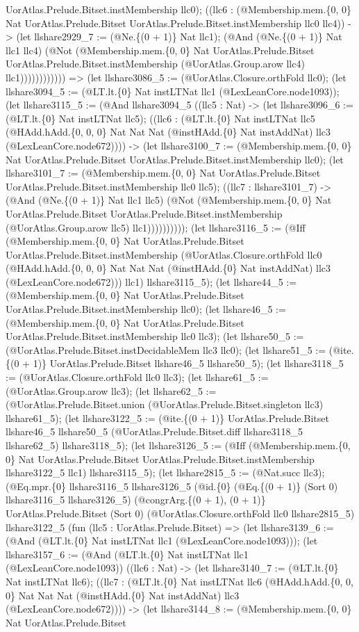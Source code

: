 \documentclass[11pt]{article}
\begin{document}
UorAtlas.Prelude.Bitset.instMembership llc0); ((llc6 : (@Membership.mem.\{0, 0\} Nat UorAtlas.Prelude.Bitset UorAtlas.Prelude.Bitset.instMembership llc0 llc4)) -> (let llshare2929\_7 := (@Ne.\{(0 + 1)\} Nat llc1); (@And (@Ne.\{(0 + 1)\} Nat llc1 llc4) (@Not (@Membership.mem.\{0, 0\} Nat UorAtlas.Prelude.Bitset UorAtlas.Prelude.Bitset.instMembership (@UorAtlas.Group.arow llc4) llc1)))))))))))) => (let llshare3086\_5 := (@UorAtlas.Closure.orthFold llc0); (let llshare3094\_5 := (@LT.lt.\{0\} Nat instLTNat llc1 (@LexLeanCore.node1093)); (let llshare3115\_5 := (@And llshare3094\_5 ((llc5 : Nat) -> (let llshare3096\_6 := (@LT.lt.\{0\} Nat instLTNat llc5); ((llc6 : (@LT.lt.\{0\} Nat instLTNat llc5 (@HAdd.hAdd.\{0, 0, 0\} Nat Nat Nat (@instHAdd.\{0\} Nat instAddNat) llc3 (@LexLeanCore.node672)))) -> (let llshare3100\_7 := (@Membership.mem.\{0, 0\} Nat UorAtlas.Prelude.Bitset UorAtlas.Prelude.Bitset.instMembership llc0); (let llshare3101\_7 := (@Membership.mem.\{0, 0\} Nat UorAtlas.Prelude.Bitset UorAtlas.Prelude.Bitset.instMembership llc0 llc5); ((llc7 : llshare3101\_7) -> (@And (@Ne.\{(0 + 1)\} Nat llc1 llc5) (@Not (@Membership.mem.\{0, 0\} Nat UorAtlas.Prelude.Bitset UorAtlas.Prelude.Bitset.instMembership (@UorAtlas.Group.arow llc5) llc1)))))))))); (let llshare3116\_5 := (@Iff (@Membership.mem.\{0, 0\} Nat UorAtlas.Prelude.Bitset UorAtlas.Prelude.Bitset.instMembership (@UorAtlas.Closure.orthFold llc0 (@HAdd.hAdd.\{0, 0, 0\} Nat Nat Nat (@instHAdd.\{0\} Nat instAddNat) llc3 (@LexLeanCore.node672))) llc1) llshare3115\_5); (let llshare44\_5 := (@Membership.mem.\{0, 0\} Nat UorAtlas.Prelude.Bitset UorAtlas.Prelude.Bitset.instMembership llc0); (let llshare46\_5 := (@Membership.mem.\{0, 0\} Nat UorAtlas.Prelude.Bitset UorAtlas.Prelude.Bitset.instMembership llc0 llc3); (let llshare50\_5 := (@UorAtlas.Prelude.Bitset.instDecidableMem llc3 llc0); (let llshare51\_5 := (@ite.\{(0 + 1)\} UorAtlas.Prelude.Bitset llshare46\_5 llshare50\_5); (let llshare3118\_5 := (@UorAtlas.Closure.orthFold llc0 llc3); (let llshare61\_5 := (@UorAtlas.Group.arow llc3); (let llshare62\_5 := (@UorAtlas.Prelude.Bitset.union (@UorAtlas.Prelude.Bitset.singleton llc3) llshare61\_5); (let llshare3122\_5 := (@ite.\{(0 + 1)\} UorAtlas.Prelude.Bitset llshare46\_5 llshare50\_5 (@UorAtlas.Prelude.Bitset.diff llshare3118\_5 llshare62\_5) llshare3118\_5); (let llshare3126\_5 := (@Iff (@Membership.mem.\{0, 0\} Nat UorAtlas.Prelude.Bitset UorAtlas.Prelude.Bitset.instMembership llshare3122\_5 llc1) llshare3115\_5); (let llshare2815\_5 := (@Nat.succ llc3); (@Eq.mpr.\{0\} llshare3116\_5 llshare3126\_5 (@id.\{0\} (@Eq.\{(0 + 1)\} (Sort 0) llshare3116\_5 llshare3126\_5) (@congrArg.\{(0 + 1), (0 + 1)\} UorAtlas.Prelude.Bitset (Sort 0) (@UorAtlas.Closure.orthFold llc0 llshare2815\_5) llshare3122\_5 (fun (llc5 : UorAtlas.Prelude.Bitset) => (let llshare3139\_6 := (@And (@LT.lt.\{0\} Nat instLTNat llc1 (@LexLeanCore.node1093))); (let llshare3157\_6 := (@And (@LT.lt.\{0\} Nat instLTNat llc1 (@LexLeanCore.node1093)) ((llc6 : Nat) -> (let llshare3140\_7 := (@LT.lt.\{0\} Nat instLTNat llc6); ((llc7 : (@LT.lt.\{0\} Nat instLTNat llc6 (@HAdd.hAdd.\{0, 0, 0\} Nat Nat Nat (@instHAdd.\{0\} Nat instAddNat) llc3 (@LexLeanCore.node672)))) -> (let llshare3144\_8 := (@Membership.mem.\{0, 0\} Nat UorAtlas.Prelude.Bitset 
\end{document}
